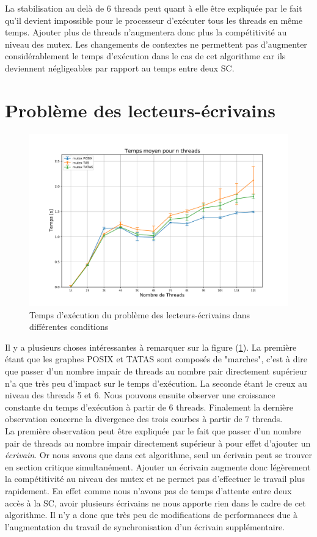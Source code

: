 \noindent La stabilisation au delà de 6 threads peut quant à elle être expliquée par le fait qu'il devient impossible pour le processeur d'exécuter tous les threads en même temps. Ajouter plus de threads n'augmentera donc plus la compétitivité au niveau des mutex. Les changements de contextes ne permettent pas d'augmenter considérablement le temps d'exécution dans le cas de cet algorithme car ils deviennent négligeables par rapport au temps entre deux SC.


\section{Problème des lecteurs-écrivains}

\begin{figure}[H]
    \centering
    \includegraphics[scale=0.45]{img/readwrt.pdf}
    \caption{Temps d'exécution du problème des lecteurs-écrivains dans différentes conditions}
    \label{pic:readwrt}
\end{figure}

\noindent Il y a plusieurs choses intéressantes à remarquer sur la figure (\ref{pic:readwrt}). La première étant que les graphes POSIX et TATAS sont composés de "marches", c'est à dire que passer d'un nombre impair de threads au nombre pair directement supérieur n'a que très peu d'impact sur le temps d'exécution. La seconde étant le creux au niveau des threads 5 et 6. Nous pouvons ensuite observer une croissance constante du temps d'exécution à partir de 6 threads. Finalement la dernière observation concerne la divergence des trois courbes à partir de 7 threads.\\

\noindent La première observation peut être expliquée par le fait que passer d'un nombre pair de threads au nombre impair directement supérieur à pour effet d'ajouter un \textit{écrivain}. Or nous savons que dans cet algorithme, seul un écrivain peut se trouver en section critique simultanément. Ajouter un écrivain augmente donc légèrement la compétitivité au niveau des mutex et ne permet pas d'effectuer le travail plus rapidement. 
En effet comme nous n'avons pas de temps d'attente entre deux accès à la SC, avoir plusieurs écrivains ne nous apporte rien dans le cadre de cet algorithme. Il n'y a donc que très peu de modifications de performances due à l'augmentation du travail de synchronisation d'un écrivain supplémentaire.\\

